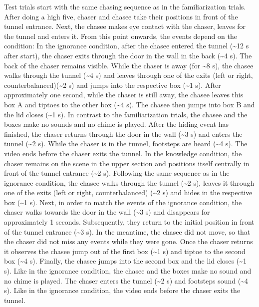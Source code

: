 \documentclass[
  man, donotrepeattitle,floatsintext]{apa6}
\begin{document}
Test trials start with the same chasing sequence as in the familiarization trials. After doing a high five, chaser and chasee take their positions in front of the tunnel entrance. Next, the chasee makes eye contact with the chaser, leaves for the tunnel and enters it. From this point onwards, the events depend on the condition:
In the ignorance condition, after the chasee entered the tunnel (\textasciitilde12 s after start), the chaser exits through the door in the wall in the back (\textasciitilde4 s). The back of the chaser remains visible. While the chaser is away (for \textasciitilde8 s), the chasee walks through the tunnel (\textasciitilde4 s) and leaves through one of the exits (left or right, counterbalanced)(\textasciitilde2 s) and jumps into the respective box (\textasciitilde1 s). After approximately one second, while the chaser is still away, the chasee leaves this box A and tiptoes to the other box (\textasciitilde4 s). The chasee then jumps into box B and the lid closes (\textasciitilde1 s). In contrast to the familiarization trials, the chasee and the boxes make no sounds and no chime is played. After the hiding event has finished, the chaser returns through the door in the wall (\textasciitilde3 s) and enters the tunnel (\textasciitilde2 s). While the chaser is in the tunnel, footsteps are heard (\textasciitilde4 s). The video ends before the chaser exits the tunnel.
In the knowledge condition, the chaser remains on the scene in the upper section and positions itself centrally in front of the tunnel entrance (\textasciitilde2 s). Following the same sequence as in the ignorance condition, the chasee walks through the tunnel (\textasciitilde2 s), leaves it through one of the exits (left or right, counterbalanced) (\textasciitilde2 s) and hides in the respective box (\textasciitilde1 s). Next, in order to match the events of the ignorance condition, the chaser walks towards the door in the wall (\textasciitilde3 s) and disappears for approximately 1 seconds. Subsequently, they return to the initial position in front of the tunnel entrance (\textasciitilde3 s). In the meantime, the chasee did not move, so that the chaser did not miss any events while they were gone. Once the chaser returns it observes the chasee jump out of the first box (\textasciitilde1 s) and tiptoe to the second box (\textasciitilde4 s). Finally, the chasee jumps into the second box and the lid closes (\textasciitilde1 s). Like in the ignorance condition, the chasee and the boxes make no sound and no chime is played. The chaser enters the tunnel (\textasciitilde2 s) and footsteps sound (\textasciitilde4 s). Like in the ignorance condition, the video ends before the chaser exits the tunnel.
\end{document}
